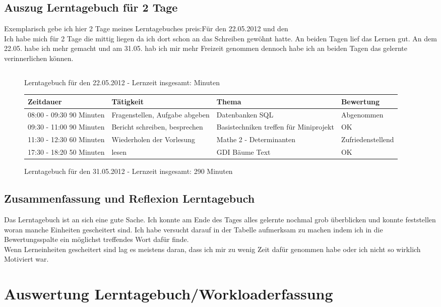 \documentclass[11pt]{article}
\begin{document}
\subsection{Auszug Lerntagebuch für 2 Tage}
Exemplarisch gebe ich hier 2 Tage meines Lerntagebuches preis:Für den 22.05.2012 und den  \\
Ich habe mich für 2 Tage die mittig liegen da ich dort schon an das Schreiben gewöhnt hatte. An beiden Tagen lief das Lernen gut. An dem 22.05. habe ich mehr gemacht und am 31.05. hab ich mir mehr Freizeit genommen dennoch habe ich an beiden Tagen das gelernte verinnerlichen können.
\\
\begin{figure}
\begin{tabular}{|p{2.3cm}|p{4.5cm}|p{4.5cm}|p{3cm}|}
\end{tabular}
\caption{Lerntagebuch für den 22.05.2012 - Lernzeit insgesamt:  Minuten}
\end{figure}

\begin{figure}
\begin{tabular}{|p{2.3cm}|p{4.5cm}|p{4.5cm}|p{3cm}|}
\hline
Zeitdauer & Tätigkeit & Thema & Bewertung \\
\hline
\hline
08:00 - 09:30  
90 Minuten& Fragenstellen, Aufgabe abgeben & Datenbanken SQL & Abgenommen\\
\hline
09:30 - 11:00
90 Minuten & Bericht schreiben, besprechen & Basistechniken treffen für Miniprojekt & OK\\
\hline
11:30 - 12:30
60 Minuten & Wiederholen der Vorlesung & Mathe 2 - Determinanten & Zufriedenstellend\\
\hline
17:30 - 18:20
50 Minuten & lesen & GDI Bäume Text & OK\\
\hline

\end{tabular}
\caption{Lerntagebuch für den 31.05.2012 - Lernzeit insgesamt: 290 Minuten}
\end{figure}


\newpage

\subsection{Zusammenfassung und Reflexion Lerntagebuch}
Das Lerntagebuch ist an sich eine gute Sache. Ich konnte am Ende des Tages alles gelernte nochmal grob überblicken und konnte feststellen woran manche Einheiten gescheitert sind. Ich habe versucht darauf in der Tabelle aufmerksam zu machen indem ich in die Bewertungsspalte ein möglichst treffendes Wort dafür finde. \\ Wenn Lerneinheiten gescheitert sind lag es meistens daran, dass ich mir zu wenig Zeit dafür genommen habe oder ich nicht so wirklich Motiviert war.\\


\section{Auswertung Lerntagebuch/Workloaderfassung}
\end{document}
